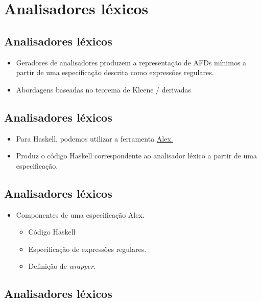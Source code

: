\documentclass[11pt]{article}
\begin{document}
\section*{Analisadores léxicos}
\label{sec:org8d8c214}

\subsection*{Analisadores léxicos}
\label{sec:org286a311}

\begin{itemize}
\item Geradores de analisadores produzem a representação de AFDs mínimos
a partir de uma especificação descrita como expressões regulares.

\item Abordagens baseadas no teorema de Kleene / derivadas
\end{itemize}
\subsection*{Analisadores léxicos}
\label{sec:org4d8efe0}

\begin{itemize}
\item Para Haskell, podemos utilizar a ferramenta \href{https://github.com/haskell/alex}{Alex.}

\item Produz o código Haskell correspondente ao analisador léxico a partir de
uma especificação.
\end{itemize}
\subsection*{Analisadores léxicos}
\label{sec:org324d4ad}

\begin{itemize}
\item Componentes de uma especificação Alex.
\begin{itemize}
\item Código Haskell
\item Especificação de expressões regulares.
\item Definição de \emph{wrapper}.
\end{itemize}
\end{itemize}
\subsection*{Analisadores léxicos}
\label{sec:orgcb16835}
\end{document}

